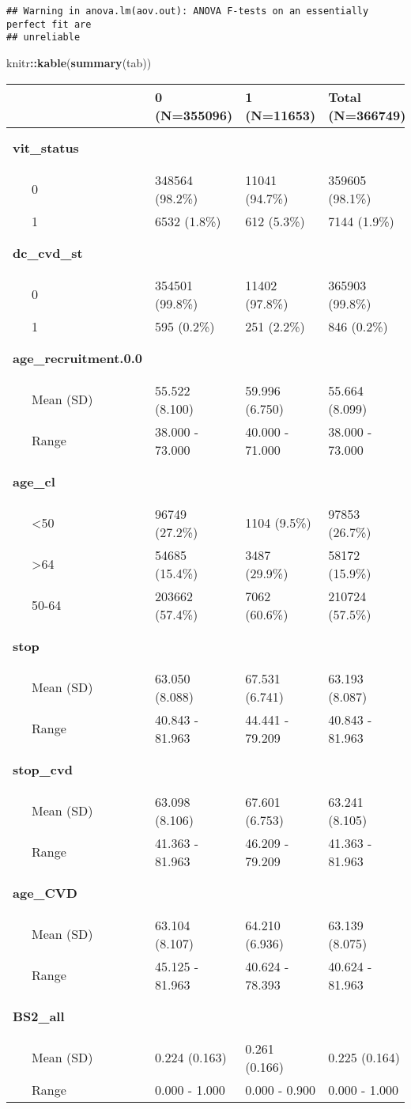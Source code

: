 \documentclass[]{article}
\newenvironment{Shaded}{\begin{snugshade}}{\end{snugshade}}
\newcommand{\KeywordTok}[1]{\textcolor[rgb]{0.13,0.29,0.53}{\textbf{#1}}}
\newcommand{\NormalTok}[1]{#1}
\newcommand{\OperatorTok}[1]{\textcolor[rgb]{0.81,0.36,0.00}{\textbf{#1}}}
\begin{document}
\begin{verbatim}
## Warning in anova.lm(aov.out): ANOVA F-tests on an essentially perfect fit are
## unreliable
\end{verbatim}

\begin{Shaded}
\begin{Highlighting}[]
\NormalTok{knitr}\OperatorTok{::}\KeywordTok{kable}\NormalTok{(}\KeywordTok{summary}\NormalTok{(tab))}
\end{Highlighting}
\end{Shaded}

\begin{longtable}[]{@{}lllll@{}}
\toprule
& 0 (N=355096) & 1 (N=11653) & Total (N=366749) & p value\tabularnewline
\midrule
\endhead
\textbf{vit\_status} & & & & \textless{} 0.001\tabularnewline
~~~0 & 348564 (98.2\%) & 11041 (94.7\%) & 359605 (98.1\%)
&\tabularnewline
~~~1 & 6532 (1.8\%) & 612 (5.3\%) & 7144 (1.9\%) &\tabularnewline
\textbf{dc\_cvd\_st} & & & & \textless{} 0.001\tabularnewline
~~~0 & 354501 (99.8\%) & 11402 (97.8\%) & 365903 (99.8\%)
&\tabularnewline
~~~1 & 595 (0.2\%) & 251 (2.2\%) & 846 (0.2\%) &\tabularnewline
\textbf{age\_recruitment.0.0} & & & & \textless{} 0.001\tabularnewline
~~~Mean (SD) & 55.522 (8.100) & 59.996 (6.750) & 55.664 (8.099)
&\tabularnewline
~~~Range & 38.000 - 73.000 & 40.000 - 71.000 & 38.000 - 73.000
&\tabularnewline
\textbf{age\_cl} & & & & \textless{} 0.001\tabularnewline
~~~\textless{}50 & 96749 (27.2\%) & 1104 (9.5\%) & 97853 (26.7\%)
&\tabularnewline
~~~\textgreater{}64 & 54685 (15.4\%) & 3487 (29.9\%) & 58172 (15.9\%)
&\tabularnewline
~~~50-64 & 203662 (57.4\%) & 7062 (60.6\%) & 210724 (57.5\%)
&\tabularnewline
\textbf{stop} & & & & \textless{} 0.001\tabularnewline
~~~Mean (SD) & 63.050 (8.088) & 67.531 (6.741) & 63.193 (8.087)
&\tabularnewline
~~~Range & 40.843 - 81.963 & 44.441 - 79.209 & 40.843 - 81.963
&\tabularnewline
\textbf{stop\_cvd} & & & & \textless{} 0.001\tabularnewline
~~~Mean (SD) & 63.098 (8.106) & 67.601 (6.753) & 63.241 (8.105)
&\tabularnewline
~~~Range & 41.363 - 81.963 & 46.209 - 79.209 & 41.363 - 81.963
&\tabularnewline
\textbf{age\_CVD} & & & & \textless{} 0.001\tabularnewline
~~~Mean (SD) & 63.104 (8.107) & 64.210 (6.936) & 63.139 (8.075)
&\tabularnewline
~~~Range & 45.125 - 81.963 & 40.624 - 78.393 & 40.624 - 81.963
&\tabularnewline
\textbf{BS2\_all} & & & & \textless{} 0.001\tabularnewline
~~~Mean (SD) & 0.224 (0.163) & 0.261 (0.166) & 0.225 (0.164)
&\tabularnewline
~~~Range & 0.000 - 1.000 & 0.000 - 0.900 & 0.000 - 1.000
&\tabularnewline

\end{longtable}
\end{document}
